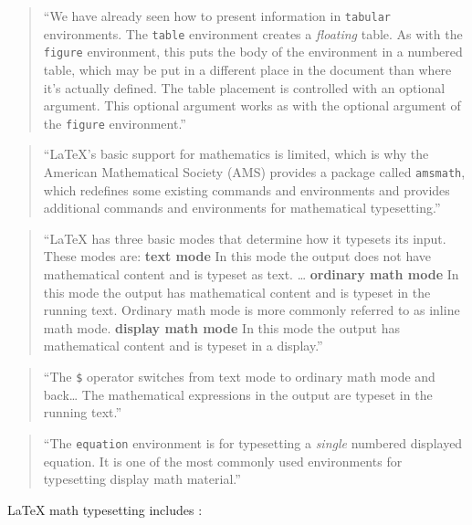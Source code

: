 \documentclass[]{tufte-book}
\begin{document}
\begin{quote}
``We have already seen how to present information in \texttt{tabular} environments.
The \texttt{table} environment creates a \emph{floating} table. As with the \texttt{figure}
environment, this puts the body of the environment in a numbered table,
which may be put in a different place in the document than where it's
actually defined. The table placement is controlled with an optional argument.
This optional argument works as with the optional argument of the
\texttt{figure} environment.'' \citep{van2012latex}
\end{quote}

\begin{quote}
``LaTeX's basic support for mathematics is limited, which is why the
American Mathematical Society (AMS) provides a package called \texttt{amsmath},
which redefines some existing commands and environments and provides
additional commands and environments for mathematical
typesetting.'' \citep{van2012latex}
\end{quote}

\begin{quote}
``LaTeX has three basic modes that determine how it typesets its input.
These modes are: \textbf{text mode} In this mode the output does not have mathematical
content and is typeset as text. \ldots{} \textbf{ordinary math mode} In this mode the
output has mathematical content and is typeset in the running text. Ordinary
math mode is more commonly referred to as inline math mode. \textbf{display math
mode} In this mode the output has mathematical content and is typeset in a
display.'' \citep{van2012latex}
\end{quote}

\begin{quote}
``The \texttt{\$} operator switches from text mode to ordinary math mode and back\ldots{}
The mathematical expressions in the output are typeset in the running text.''
\citep{van2012latex}
\end{quote}

\begin{quote}
``The \texttt{equation} environment is for typesetting a \emph{single} numbered
displayed equation. It is one of the most commonly used environments for
typesetting display math material.'' \citep{van2012latex}
\end{quote}

LaTeX math typesetting includes \citep{van2012latex}:
\end{document}

